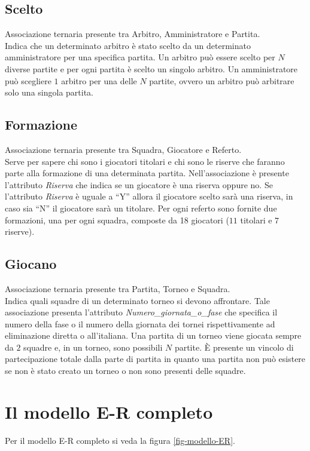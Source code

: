 	\subsection{Scelto}
	Associazione ternaria presente tra Arbitro, Amministratore e Partita. \\
	Indica che un determinato arbitro è stato scelto da un determinato amministratore per una specifica partita.
	Un arbitro può essere scelto per $N$ diverse partite e per ogni partita è scelto un singolo arbitro. Un amministratore può scegliere $1$ arbitro per una delle $N$ partite, ovvero un arbitro può arbitrare solo una singola partita.
	
	\subsection{Formazione}
	Associazione ternaria presente tra Squadra, Giocatore e Referto. \\
	Serve per sapere chi sono i giocatori titolari e chi sono le riserve che faranno parte alla formazione di una determinata partita.
	Nell'associazione è presente l'attributo \emph{Riserva} che indica se un giocatore è una riserva oppure no.
	Se l'attributo \emph{Riserva} è uguale a ``Y'' allora il giocatore scelto sarà una riserva, in caso sia ``N'' il giocatore sarà un titolare.
	Per ogni referto sono fornite due formazioni, una per ogni squadra, composte da 18 giocatori ($11$ titolari e $7$ riserve).
	
	\subsection{Giocano}
	Associazione ternaria presente tra Partita, Torneo e Squadra. \\
	Indica quali squadre di un determinato torneo si devono affrontare. Tale associazione presenta l’attributo \emph{Numero\_giornata\_o\_fase} che specifica il numero della fase o il numero della giornata dei tornei rispettivamente ad eliminazione diretta o all'italiana. Una partita di un torneo viene giocata sempre da $2$ squadre e, in un torneo, sono possibili $N$ partite. È presente un vincolo di partecipazione totale dalla parte di partita in quanto una partita non può esistere se non è stato creato un torneo o non sono presenti delle squadre.
	

\section{Il modello E-R completo}
Per il modello E-R completo si veda la figura \vref{fig-modello-ER}.


